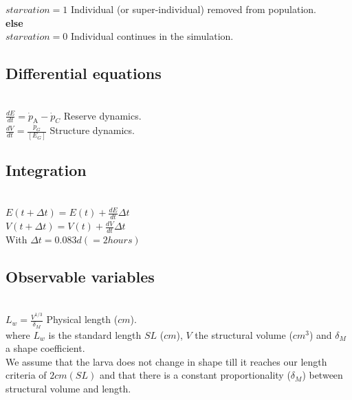 $starvation = 1$ \hfill Individual (or super-individual) removed from population.\\

\textbf{else}\\

$starvation = 0$ \hfill Individual continues in the simulation.\\

\subsection*{Differential equations}
\hfill \\

$\frac{dE}{dt} = \dot{p}_\mathrm{A} - \dot{p}_{C}$ \hfill Reserve dynamics.\\

$\frac{dV}{dt} = \frac{\dot{p}_{G}}{\left[ E_{G} \right]}$ \hfill Structure dynamics.\\

\subsection*{Integration}
\hfill \\

$E\left ( t + \Delta t \right ) = E\left ( t \right ) + \frac{dE}{dt}\Delta t$ \\

$V\left ( t + \Delta t \right ) = V\left ( t \right ) + \frac{dV}{dt}\Delta t$ \\

With $\Delta t = 0.083 d \left (=2hours\right )$

\subsection*{Observable variables}
\hfill \\

$L_{w} = \frac{V^{1/3}}{\delta_{M}}$ \hfill Physical length ($cm$).\\

where $L_{w}$ is the standard length $SL$ ($cm$), $V$ the structural volume ($cm^3$) and $\delta_{M}$ a shape coefficient.\\

We assume that the larva does not change in shape till it reaches our length criteria of $2cm(SL)$ and that there is a constant proportionality ($\delta_{M}$) between structural volume and length.\\

